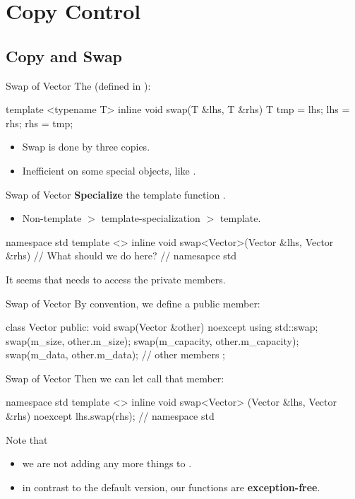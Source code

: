 \documentclass{beamer}
\begin{document}
\section{Copy Control}

\subsection{Copy and Swap}

\begin{frame}[fragile]{Swap of Vector}
    The  (defined in ):
    \begin{cpp}
template <typename T>
inline void swap(T &lhs, T &rhs) {
  T tmp = lhs;
  lhs = rhs;
  rhs = tmp;
}
    \end{cpp}
    \begin{itemize}
        \item Swap is done by three copies.
        \item Inefficient on some special objects, like .
    \end{itemize}
\end{frame}

\begin{frame}[fragile]{Swap of Vector}
    \textbf{Specialize} the template function .
    \begin{itemize}
        \item Non-template \(>\) template-specialization \(>\) template.
    \end{itemize}
    \begin{cpp}
namespace std {
template <>
inline void swap<Vector>(Vector &lhs, Vector &rhs) {
  // What should we do here?
}
} // namesapce std
    \end{cpp}
    It seems that  needs to access the private members.
\end{frame}

\begin{frame}[fragile]{Swap of Vector}
    By convention, we define a public member:
    \begin{cpp}
class Vector {
 public:
  void swap(Vector &other) noexcept {
    using std::swap;
    swap(m_size, other.m_size);
    swap(m_capacity, other.m_capacity);
    swap(m_data, other.m_data);
  }
  // other members
};
    \end{cpp}
\end{frame}

\begin{frame}[fragile]{Swap of Vector}
    Then we can let  call that member:
    \begin{cpp}
namespace std {
template <>
inline void swap<Vector>
    (Vector &lhs, Vector &rhs) noexcept {
  lhs.swap(rhs);
}
} // namespace std
    \end{cpp}
    Note that
    \begin{itemize}
        \item we are not adding any more things to .
        \item in contrast to the default version, our  functions are \textbf{exception-free}.
    \end{itemize}
\end{frame}
\end{document}
